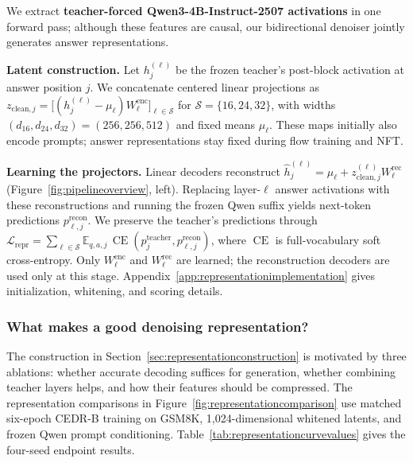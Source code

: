 \documentclass[11pt,letterpaper]{article}
\newcommand{\E}{\mathbb{E}}
\newcommand{\CE}{\operatorname{CE}}
\begin{document}
We extract \textbf{teacher-forced Qwen3-4B-Instruct-2507 activations} \citep{qwen2507} in one forward pass; although these features are causal, our bidirectional denoiser jointly generates answer representations.

\textbf{Latent construction.}
Let $h_j^{(\ell)}$ be the frozen teacher's post-block activation at answer position $j$. We concatenate centered linear projections as $z_{\mathrm{clean},j}=\big[(h_j^{(\ell)}-\mu_\ell)W_\ell^{\mathrm{enc}}\big]_{\ell\in\mathcal S}$ for $\mathcal S=\{16,24,32\}$, with widths $(d_{16},d_{24},d_{32})=(256,256,512)$ and fixed means $\mu_\ell$. These maps initially also encode prompts; answer representations stay fixed during flow training and NFT.

\textbf{Learning the projectors.}
Linear decoders reconstruct $\widehat h_j^{(\ell)}=\mu_\ell+z_{\mathrm{clean},j}^{(\ell)}W_\ell^{\mathrm{rec}}$ (Figure~\ref{fig:pipelineoverview}, left). Replacing layer-$\ell$ answer activations with these reconstructions and running the frozen Qwen suffix yields next-token predictions $p_{\ell,j}^{\mathrm{recon}}$. We preserve the teacher's predictions through $\mathcal L_{\mathrm{repr}}=\sum_{\ell\in\mathcal S}\E_{q,a,j}\,\CE(p_j^{\mathrm{teacher}},p_{\ell,j}^{\mathrm{recon}})$, where $\CE$ is full-vocabulary soft cross-entropy. Only $W_\ell^{\mathrm{enc}}$ and $W_\ell^{\mathrm{rec}}$ are learned; the reconstruction decoders are used only at this stage. Appendix~\ref{app:representationimplementation} gives initialization, whitening, and scoring details.

\subsubsection{What makes a good denoising representation?}
\label{sec:representationablations}

The construction in Section~\ref{sec:representationconstruction} is motivated by three ablations: whether accurate decoding suffices for generation, whether combining teacher layers helps, and how their features should be compressed. The representation comparisons in Figure~\ref{fig:representationcomparison} use matched six-epoch CEDR-B training on GSM8K, 1,024-dimensional whitened latents, and frozen Qwen prompt conditioning. Table~\ref{tab:representationcurvevalues} gives the four-seed endpoint results.
\end{document}
